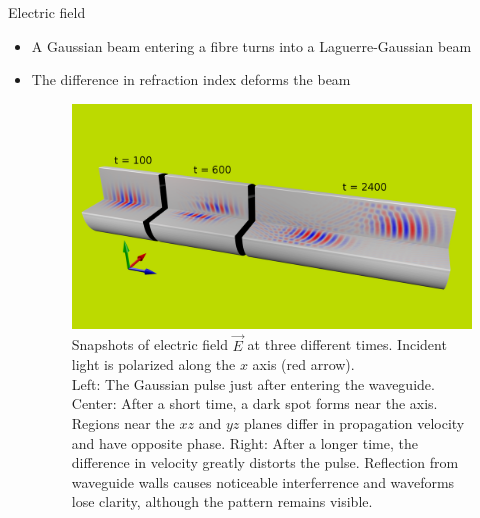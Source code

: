 \documentclass[8pt]{beamer}
\newlength{\wideitemsep}
\let\olditem\item
\renewcommand{\item}{\setlength{\itemsep}{\wideitemsep}\olditem}
\newcommand{\blockpadding}{
  \rule[-0.6ex]{0pt}{2.5ex}
}
\begin{document}
\begin{columns}[t]
 \begin{column}{0.596\textwidth}
  \begin{block}{\blockpadding Electric field}
  \begin{itemize}
   \item A Gaussian beam entering a fibre turns into a Laguerre-Gaussian beam
   \item The difference in refraction index deforms the beam
   \vspace{1ex}
\begin{figure}[h]
\centering
 \includegraphics[width=.825\textwidth,clip,trim=0mm 50mm 0mm 80mm]{./render_t}
 \caption{Snapshots of electric field $\vec E$ at three different times. Incident light is polarized along the $x$ axis (red arrow). \\{\color{dark} Left:} The Gaussian pulse just after entering the waveguide. {\color{dark} Center:} After a short time, a dark spot forms near the axis. Regions near the $xz$ and $yz$ planes differ in propagation velocity and have opposite phase. {\color{dark} Right:} After a longer time, the difference in velocity greatly distorts the pulse. Reflection from waveguide walls causes noticeable interferrence and waveforms lose clarity, although the pattern remains visible. }
\end{figure}
\end{itemize}


\end{block}
\end{column}
\end{columns}
\end{document}
